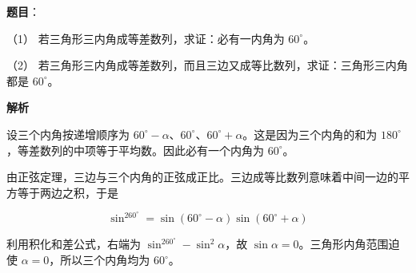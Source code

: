 \begin{answer}

\textbf{题目}：

（1） 若三角形三内角成等差数列，求证：必有一内角为 $60^\circ$。

（2） 若三角形三内角成等差数列，而且三边又成等比数列，求证：三角形三内角都是 $60^\circ$。

\textbf{解析}


设三个内角按递增顺序为 $60^\circ-\alpha$、$60^\circ$、$60^\circ+\alpha$。这是因为三个内角的和为 $180^\circ$，等差数列的中项等于平均数。因此必有一个内角为 $60^\circ$。


由正弦定理，三边与三个内角的正弦成正比。三边成等比数列意味着中间一边的平方等于两边之积，于是

\nopagebreak[4]
\[
\sin^260^\circ=\sin(60^\circ-\alpha)\sin(60^\circ+\alpha)
\]

利用积化和差公式，右端为 $\sin^260^\circ-\sin^2\alpha$，故 $\sin\alpha=0$。三角形内角范围迫使 $\alpha=0$，所以三个内角均为 $60^\circ$。



\end{answer}
